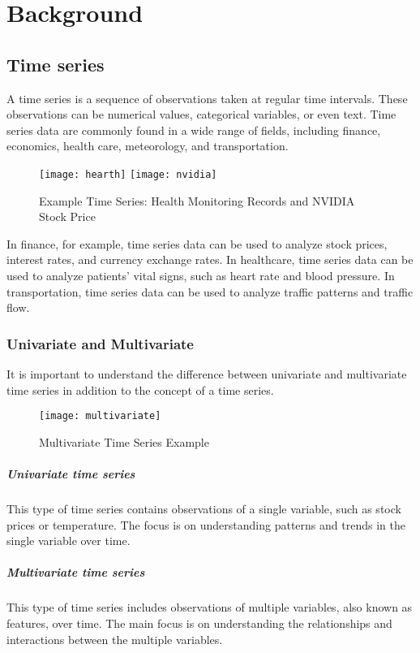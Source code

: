 \chapter{Background}

\section{Time series}
A time series is a sequence of observations taken at regular time intervals.
These observations can be numerical values, categorical variables, or even text.
Time series data are commonly found in a wide range of fields, including finance, economics, health care, meteorology, and transportation.

\begin{figure}[H]
  \centering
  \texttt{[image: hearth]}
  \texttt{[image: nvidia]}
  \caption{Example Time Series: Health Monitoring Records \cite{influxdata} and NVIDIA Stock Price \cite{finance}}
\end{figure}

In finance, for example, time series data can be used to analyze stock prices, interest rates, and currency exchange rates.
In healthcare, time series data can be used to analyze patients' vital signs, such as heart rate and blood pressure.
In transportation, time series data can be used to analyze traffic patterns and traffic flow.

\subsection{Univariate and Multivariate}

It is important to understand the difference between univariate and multivariate time series in addition to the concept of a time series.
\begin{figure}[H]
  \centering
  \texttt{[image: multivariate]}
  \caption{Multivariate Time Series Example \cite{mltech}}
\end{figure}

\paragraph{Univariate time series} This type of time series contains observations of a single variable, such as stock prices or temperature. The focus is on understanding patterns and trends in the single variable over time.
\paragraph{Multivariate time series} This type of time series includes observations of multiple variables, also known as features, over time. The main focus is on understanding the relationships and interactions between the multiple variables.

